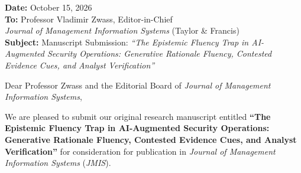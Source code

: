 \documentclass[11pt,a4paper]{article}
\begin{document}
\thispagestyle{empty}

\noindent\textbf{Date:} October 15, 2026\\[0.5em]
\textbf{To:} Professor Vladimir Zwass, Editor-in-Chief\\
\textit{Journal of Management Information Systems} (Taylor \& Francis)\\[0.5em]
\textbf{Subject:} Manuscript Submission: \textit{``The Epistemic Fluency Trap in AI-Augmented Security Operations: Generative Rationale Fluency, Contested Evidence Cues, and Analyst Verification''}

\bigskip
\noindent Dear Professor Zwass and the Editorial Board of \textit{Journal of Management Information Systems},

\medskip
We are pleased to submit our original research manuscript entitled \textbf{``The Epistemic Fluency Trap in AI-Augmented Security Operations: Generative Rationale Fluency, Contested Evidence Cues, and Analyst Verification''} for consideration for publication in \textit{Journal of Management Information Systems} (\textit{JMIS}).
\end{document}
